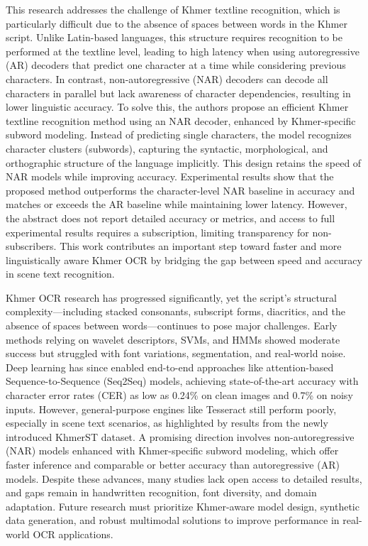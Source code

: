 \citet{Rina2025} This research addresses the challenge of Khmer textline recognition, 
which is particularly difficult due to the absence of spaces between words in the Khmer script. 
Unlike Latin-based languages, this structure requires recognition to be performed at the textline level, 
leading to high latency when using autoregressive (AR) decoders that predict one character at a 
time while considering previous characters. In contrast, non-autoregressive (NAR) decoders can decode 
all characters in parallel but lack awareness of character dependencies, resulting in lower linguistic 
accuracy. To solve this, the authors propose an efficient Khmer textline recognition method using an NAR 
decoder, enhanced by Khmer-specific subword modeling. Instead of predicting single characters, the model 
recognizes character clusters (subwords), capturing the syntactic, morphological, and orthographic 
structure of the language implicitly. This design retains the speed of NAR models while improving accuracy. 
Experimental results show that the proposed method outperforms the character-level NAR baseline 
in accuracy and matches or exceeds the AR baseline while maintaining lower latency. However, 
the abstract does not report detailed accuracy or metrics, and access to full experimental results 
requires a subscription, limiting transparency for non-subscribers. This work contributes an 
important step toward faster and more linguistically aware Khmer OCR by bridging the gap between 
speed and accuracy in scene text recognition.

Khmer OCR research has progressed significantly, yet the script’s structural complexity—including 
stacked consonants, subscript forms, diacritics, and the absence of spaces between words—continues 
to pose major challenges. Early methods relying on wavelet descriptors, SVMs, and HMMs showed moderate 
success but struggled with font variations, segmentation, and real-world noise. Deep learning has 
since enabled end-to-end approaches like attention-based Sequence-to-Sequence (Seq2Seq) models, 
achieving state-of-the-art accuracy with character error rates (CER) as low as 0.24\% on clean 
images and 0.7\% on noisy inputs. However, general-purpose engines like Tesseract still perform 
poorly, especially in scene text scenarios, as highlighted by results from the newly introduced 
KhmerST dataset. A promising direction involves non-autoregressive (NAR) models enhanced with 
Khmer-specific subword modeling, which offer faster inference and comparable or better accuracy 
than autoregressive (AR) models. Despite these advances, many studies lack open access to detailed 
results, and gaps remain in handwritten recognition, font diversity, and domain adaptation. 
Future research must prioritize Khmer-aware model design, synthetic data generation, and robust 
multimodal solutions to improve performance in real-world OCR applications.
    
